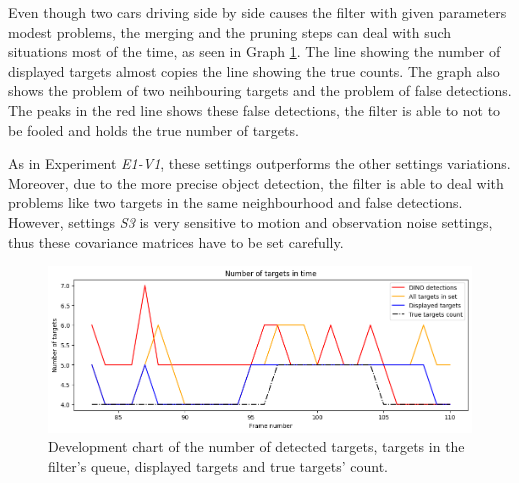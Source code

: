 Even though two cars driving side by side causes the filter with given parameters modest problems, the merging and
the pruning steps can deal with such situations most of the time, as seen in Graph \ref{gr:E1-V2-S3}. The line showing
the number of displayed targets almost copies the line showing the true counts. The graph also shows the problem of
two neihbouring targets and the problem of false detections. The peaks in the red line shows these false detections,
the filter is able to not to be fooled and holds the true number of targets.


As in Experiment \textit{E1-V1}, these settings outperforms the other settings variations. Moreover, due to the more
precise
object detection, the filter is able to deal with problems like two targets in the same neighbourhood and false
detections. However, settings \textit{S3} is very sensitive to motion and observation noise settings, thus
these covariance matrices have to be set carefully.

\begin{figure}[H]
    \centering
    \includegraphics[width=\linewidth]{../../../experiments/E1/V2/DINO/dino_det}
    \caption{Development chart of the number of detected targets, targets in the filter's queue, displayed targets and
    true targets' count.}
    \label{gr:E1-V2-S3}
\end{figure}


